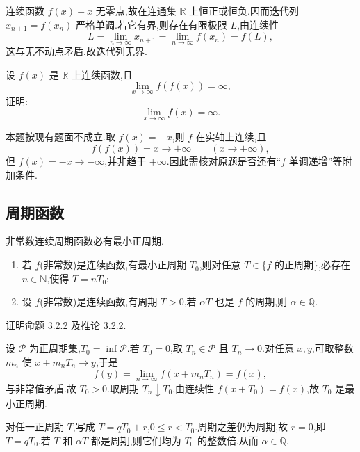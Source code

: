 \begin{solution}
    连续函数 $f(x)-x$ 无零点,故在连通集 $\mathbb R$ 上恒正或恒负.因而迭代列 $x_{n+1}=f(x_n)$ 严格单调.若它有界,则存在有限极限 $L$,由连续性
    \[
        L=\lim\limits_{n\to\infty}x_{n+1}
        =\lim\limits_{n\to\infty}f(x_n)=f(L),
    \]
    这与无不动点矛盾.故迭代列无界.
\end{solution}

\begin{example}
    设 $f(x)$ 是 $\mathbb{R}$ 上连续函数,且
    \[
        \lim\limits_{x\to\infty}f(f(x))=\infty,
    \]
    证明:
    \[
        \lim\limits_{x\to\infty}f(x)=\infty.
    \]
\end{example}
\exampleblank

\begin{solution}
    本题按现有题面不成立.取 $f(x)=-x$,则 $f$ 在实轴上连续,且
    \[
        f(f(x))=x\longrightarrow+\infty\qquad(x\to+\infty),
    \]
    但 $f(x)=-x\to-\infty$,并非趋于 $+\infty$.因此需核对原题是否还有“$f$ 单调递增”等附加条件.
\end{solution}



\subsection{周期函数}

\begin{proposition}[\markstar]
    非常数连续周期函数必有最小正周期.
\end{proposition}

\begin{corollary}[\markstar]
    \begin{enumerate}
        \item 若 $f$(非常数)是连续函数,有最小正周期 $T_0$,则对任意 $T\in\{f\text{ 的正周期}\}$,必存在 $n\in\mathbb{N}$,使得 $T=nT_0$;
        \item 设 $f$(非常数)是连续函数,有周期 $T>0$,若 $\alpha T$ 也是 $f$ 的周期,则 $\alpha\in\mathbb{Q}$.
    \end{enumerate}
\end{corollary}

\begin{example}
    证明命题 3.2.2 及推论 3.2.2.
\end{example}
\exampleblank

\begin{solution}
    设 $\mathcal P$ 为正周期集,$T_0=\inf\mathcal P$.若 $T_0=0$,取 $T_n\in\mathcal P$ 且 $T_n\to0$.对任意 $x,y$,可取整数 $m_n$ 使 $x+m_nT_n\to y$,于是
    \[
        f(y)=\lim\limits_{n\to\infty}f(x+m_nT_n)=f(x),
    \]
    与非常值矛盾.故 $T_0>0$.取周期 $T_n\downarrow T_0$,由连续性 $f(x+T_0)=f(x)$,故 $T_0$ 是最小正周期.

    对任一正周期 $T$,写成 $T=qT_0+r$,$0\leq r<T_0$.周期之差仍为周期,故 $r=0$,即 $T=qT_0$.若 $T$ 和 $\alpha T$ 都是周期,则它们均为 $T_0$ 的整数倍,从而 $\alpha\in\mathbb Q$.
\end{solution}

